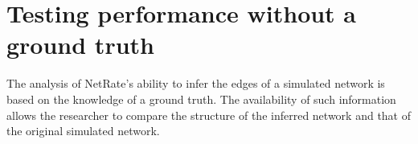 
\chapter{Testing performance without a ground truth}


The analysis of NetRate's ability to infer the edges of a simulated network is based on the knowledge of a ground truth. The availability of such information allows the researcher to compare the structure of the inferred network and that of the original simulated network.

